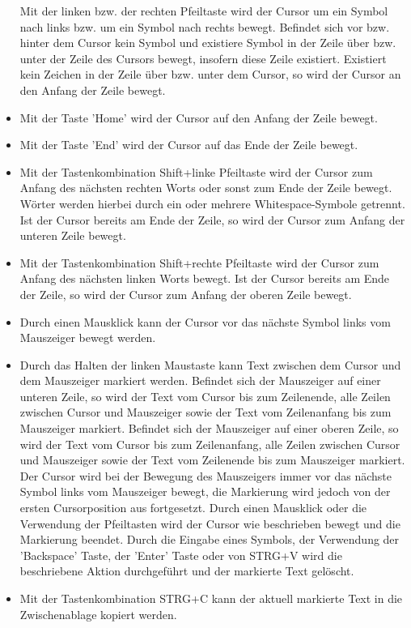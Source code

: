 \documentclass[parskip=full,11pt,twoside]{scrartcl}
\begin{document}
\begin{itemize}
	Mit der linken bzw. der rechten Pfeiltaste wird der Cursor um ein Symbol nach links bzw. um ein Symbol nach rechts bewegt. 
	Befindet sich vor bzw. hinter dem Cursor kein Symbol und existiere Symbol in der Zeile über bzw. unter der Zeile des Cursors bewegt, insofern diese Zeile existiert.
	Existiert kein Zeichen in der Zeile über bzw. unter dem Cursor, so wird der Cursor an den Anfang der Zeile bewegt.
	\item Mit der Taste 'Home' wird der Cursor auf den Anfang der Zeile bewegt.
	\item Mit der Taste 'End' wird der Cursor auf das Ende der Zeile bewegt.
	\item Mit der Tastenkombination Shift+linke Pfeiltaste wird der Cursor zum Anfang des nächsten rechten Worts oder sonst zum Ende der Zeile bewegt. Wörter werden hierbei durch ein oder mehrere Whitespace-Symbole getrennt. Ist der Cursor bereits am Ende der Zeile, so wird der Cursor zum Anfang der unteren Zeile bewegt.
	\item Mit der Tastenkombination Shift+rechte Pfeiltaste wird der Cursor zum Anfang des nächsten linken Worts bewegt. Ist der Cursor bereits am Ende der Zeile, so wird der Cursor zum Anfang der oberen Zeile bewegt.
	\item Durch einen Mausklick kann der Cursor vor das nächste Symbol links vom Mauszeiger bewegt werden.
	\item Durch das Halten der linken Maustaste kann Text zwischen dem Cursor und dem Mauszeiger markiert werden. 
	Befindet sich der Mauszeiger auf einer unteren Zeile, so wird der Text vom Cursor bis zum Zeilenende, alle Zeilen zwischen Cursor und Mauszeiger sowie der Text vom Zeilenanfang bis zum Mauszeiger markiert. 
	Befindet sich der Mauszeiger auf einer oberen Zeile, so wird der Text vom Cursor bis zum Zeilenanfang, alle Zeilen zwischen Cursor und Mauszeiger sowie der Text vom Zeilenende bis zum Mauszeiger markiert. 
	Der Cursor wird bei der Bewegung des Mauszeigers immer vor das nächste Symbol links vom Mauszeiger bewegt, die Markierung wird jedoch von der ersten Cursorposition aus fortgesetzt.
	Durch einen Mausklick oder die Verwendung der Pfeiltasten wird der Cursor wie beschrieben bewegt und die Markierung beendet.
	Durch die Eingabe eines Symbols, der Verwendung der 'Backspace' Taste, der 'Enter' Taste oder von STRG+V wird die beschriebene Aktion durchgeführt und der markierte Text gelöscht.
	\item Mit der Tastenkombination STRG+C kann der aktuell markierte Text in die Zwischenablage kopiert werden.

\end{itemize}
\end{document}

